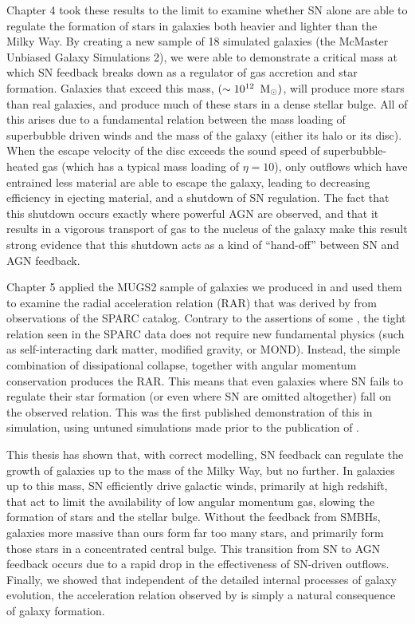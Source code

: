 Chapter 4 took these results to the limit to examine whether SN alone are able
to regulate the formation of stars in galaxies both heavier and lighter than the
Milky Way.  By creating a new sample of 18 simulated galaxies (the
McMaster Unbiased Galaxy Simulations 2), we were able to demonstrate a critical
mass at which SN feedback breaks down as a regulator of gas accretion and star
formation.  Galaxies that exceed this mass, $(\sim 10^{12}\;\>{\rm M_{\odot}})$, will produce
more stars than real galaxies, and produce much of these stars in a dense
stellar bulge.  All of this arises due to a fundamental relation between the
mass loading of superbubble driven winds and the mass of the galaxy (either its
halo or its disc).  When the escape velocity of the disc exceeds the sound speed
of superbubble-heated gas (which has a typical mass loading of $\eta=10$), only
outflows which have entrained less material are able to escape the galaxy,
leading to decreasing efficiency in ejecting material, and a shutdown of
SN regulation.  The fact that this shutdown occurs exactly where powerful AGN
are observed, and that it results in a vigorous transport of gas to the nucleus
of the galaxy make this result strong evidence that this shutdown acts as a kind
of ``hand-off'' between SN and AGN feedback.

Chapter 5 applied the MUGS2 sample of galaxies we produced in
\citet{Keller2016a} and used them to examine the radial acceleration relation
(RAR) that was derived by \citet{McGaugh2016} from observations of the SPARC
\citep{Lelli2016} catalog.  Contrary to the assertions of some
\citep{Milgrom2016}, the tight relation seen in the SPARC data does not require
new fundamental physics (such as self-interacting dark matter, modified gravity,
or MOND).  Instead, the simple combination of dissipational collapse, together
with angular momentum conservation produces the RAR. This means that even
galaxies where SN fails to regulate their star formation (or even where SN are
omitted altogether) fall on the observed relation.  This was the first published
demonstration of this in simulation, using untuned simulations made prior to the
publication of \citet{McGaugh2016}.

This thesis has shown that, with correct modelling, SN feedback can regulate the
growth of galaxies up to the mass of the Milky Way, but no further.  In galaxies
up to this mass, SN efficiently drive galactic winds, primarily at
high redshift, that act to limit the availability of low angular momentum gas,
slowing the formation of stars and the stellar bulge. Without the
feedback from SMBHs, galaxies more massive than ours form far too many stars,
and primarily form those stars in a concentrated central bulge.  This transition
from SN to AGN feedback occurs due to a rapid drop in the effectiveness of
SN-driven outflows.  Finally, we showed that independent of the detailed
internal processes of galaxy evolution, the acceleration relation observed by
\citet{McGaugh2016} is simply a natural consequence of galaxy formation.

